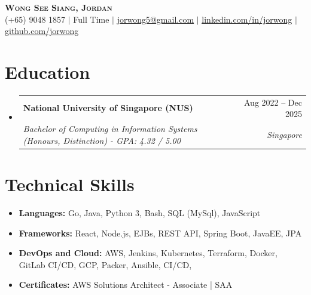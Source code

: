 \documentclass[letter-paper,11pt]{article}
\makeatletter
\newcommand{\resumeSubheading}[4]{
  \vspace{-2pt}\item
    \begin{tabular*}{0.97\textwidth}[t]{l@{\extracolsep{\fill}}r}
      \textbf{#1} & #2 \\
      \textit{#3} & \textit{\small #4} \\
    \end{tabular*}\vspace{-7pt}
}
\newcommand{\resumeProjectHeading}[3]{
    \item
    \begin{tabular*}{0.97\textwidth}{l@{\extracolsep{\fill}}r}
      \textbf{#1} $|$ \textit{#2} & #3 \\
    \end{tabular*}\vspace{-8pt}
}
\newcommand{\resumeSubHeadingListStart}{\begin{itemize}[leftmargin=0.15in, label={}]}
\newcommand{\resumeSubHeadingListEnd}{\end{itemize}}
\newenvironment{compactitemize}{
    \begin{itemize}[leftmargin=0.15in, label={}, itemsep=1pt, parsep=1pt, topsep=1pt, partopsep=1pt]
}{
    \end{itemize}
}
\makeatother
\begin{document}
\begin{center}
    \textbf{\Huge \scshape Wong See Siang, Jordan} \\ \vspace{1pt}
    \small (+65) 9048 1857 $|$ Full Time $|$ \href{mailto:jorwong5@gmail.com}{\underline{jorwong5@gmail.com}} $|$ 
    \href{https://linkedin.com/in/jorwong}{\underline{linkedin.com/in/jorwong}} $|$
    \href{https://github.com/jorwong}{\underline{github.com/jorwong}} \vspace{1.5pt} 
\end{center}

\section{Education}
  \resumeSubHeadingListStart
    \resumeSubheading
      {National University of Singapore (NUS)}{Aug 2022 -- Dec 2025}
      {Bachelor of Computing in Information Systems (Honours, Distinction) - GPA: 4.32 / 5.00}{Singapore}
  \resumeSubHeadingListEnd


\section{Technical Skills}
\begin{compactitemize}
    \small
    \item \textbf{Languages:} 
        Go, 
        Java, 
        Python 3,
        Bash, 
        SQL (MySql), 
        JavaScript
    \item \textbf{Frameworks:} 
        React, 
        Node.js, 
        EJBs, 
        REST API,
        Spring Boot, 
        JavaEE, 
        JPA
    \item \textbf{DevOps and Cloud:}
        AWS, Jenkins, Kubernetes, Terraform, Docker, GitLab CI/CD, GCP, Packer, Ansible,
        CI/CD,
    \item \textbf{Certificates:}
        AWS Solutions Architect - Associate | SAA
       
        
\end{compactitemize}
\end{document}
